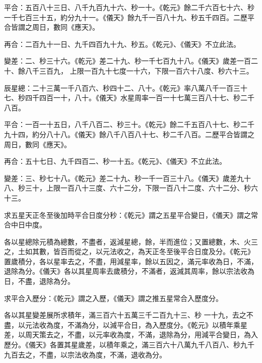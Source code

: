 \begin{pinyinscope}
 平合：五百八十三日、八千九百九十六、秒一十。《乾元》餘二千六百七十六、秒一千七百三十五，約分九十一。《儀天》餘九千一百八十九、秒五千四百。二歷平合皆謂之周日，數同《應天》。



 再合：二百九十一日、九千四百九十九、秒五。《乾元》、《儀天》不立此法。



 變差：二、秒三十六。《乾元》差二十九、秒一千七百九十八。《儀天》歲差一百二十、餘八千三百九，
 上限一百九十七度一十六，下限一百六十八度、秒六十三。



 辰星總：二十三萬一千八百六、秒四十二、八十。《乾元》率八萬八千一百三十七、秒四千四百一十，八十。《儀天》水星周率一百一十七萬三百八十七、秒二千八百。



 平合：一百一十五日，八千八百二、秒三十。《乾元》餘二千五百八十七、秒二千九十四，約分八十八。《儀天》餘八千八百八十七、秒二千八百。二歷平合皆謂之周日，數同《應天》。



 再合：五十七日、九千四百二、秒一十五。《乾元》、《儀天》不立此法。



 變差：三、秒七十八。《乾元》差二十九、秒一千一百三十八。《儀天》歲差九十八、秒三十，上限一百八十三度、六十二分，下限一百八十二度、六十二分、秒六十三。



 求五星天正冬至後加時平合日度分秒：《乾元》謂之五星平合變日，《儀天》謂之常合中日中度。



 各以星總除元積為總數，不盡者，返減星總，餘，半而進位；又置總數，木、火三之，土如其數，皆百而從之，以元法收之，為天正冬至後平合日度及分。《乾元》置歲積分，各以星率去之，不盡，用減星率，餘以五因之，滿元率收為日，不滿，退除為分。《儀天》各以其星周率去歲積分，不滿者，返減其周率，餘以宗法收為日，不盡，退除為分。



 求平合入歷分：《乾元》謂之入歷，《儀天》謂之推五星常合入歷度分。



 各以其星變差展所求積年，滿三百六十五萬三千二百九十三、秒
 一十九，去之不盡，以元法收為度，不滿為分，以減平合日，為入歷度分。《乾元》以積年乘星差，以周天策去之，不盡，以元率收為度，不滿，退除為分，用減平合變日，為入歷分。《儀天》各置其星歲差，以積年乘之，滿三百六十八萬九千八百八、秒九千九百去之，不盡，以宗法收為度，不滿，退收為分。




\end{pinyinscope}
